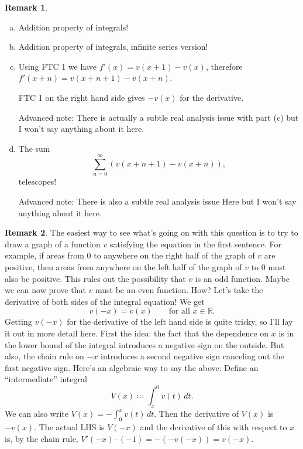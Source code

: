 \documentclass[11pt,oneside]{amsart}
\theoremstyle{definition}
\newtheorem{remark}{Remark}
\newcommand{\bR}{\mathbb{R}}
\begin{document}
\begin{remark}
  \begin{enumerate}[(a)]
    \item Addition property of integrals!
    \item Addition property of integrals, infinite series version!
    \item Using FTC 1 we have $f'(x)=v(x+1)-v(x)$, therefore $f'(x+n)=v(x+n+1)-v(x+n)$.

          FTC 1 on the right hand side gives $-v(x)$ for the derivative.

          Advanced note: There is actually a subtle real analysis issue with part (c) but I won't say anything about it here.

    \item The sum
          \[\sum_{n=0}^\infty (v(x+n+1)-v(x+n)),\]
          telescopes!

          Advanced note: There is also a subtle real analysis issue Here but I won't say anything about it here.
  \end{enumerate}
\end{remark}

\begin{remark}
  The easiest way to see what's going on with this question is to try to draw a graph of a function $v$ satisfying the equation in the first sentence. For example, if areas from 0 to anywhere on the right half of the graph of $v$ are positive, then areas from anywhere on the left half of the graph of $v$ to 0 must also be positive. This rules out the possibility that $v$ is an odd function. Maybe we can now prove that $v$ must be an even function. How? Let's take the derivative of both sides of the integral equation! We get
  \[v(-x)=v(x)\qquad\text{for all }x\in\bR.\]
  Getting $v(-x)$ for the derivative of the left hand side is quite tricky, so I'll lay it out in more detail here. First the idea: the fact that the dependence on $x$ is in the lower bound of the integral introduces a negative sign on the outside. But also, the chain rule on $-x$ introduces a second negative sign canceling out the first negative sign. Here's an algebraic way to say the above: Define an ``intermediate'' integral
  \[V(x)\coloneqq \int_x^0 v(t)\,dt.\]
  We can also write $V(x)=-\int_0^x v(t)\,dt$. Then the derivative of $V(x)$ is $-v(x)$. The actual LHS is $V(-x)$ and the derivative of this with respect to $x$ is, by the chain rule, $V'(-x)\cdot (-1)=-(-v(-x))=v(-x)$.
\end{remark}
\end{document}
